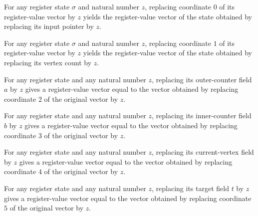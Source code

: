 \begin{lemma}
\label{Complexity.LogProg.UReg.u_0}
\leanok
{}
For any register state $\sigma$ and natural number $z$, replacing coordinate $0$ of its
register-value vector by $z$ yields the register-value vector of the state obtained by
replacing its input pointer by $z$.
\end{lemma}

\begin{lemma}
\label{Complexity.LogProg.UReg.u_1}
\leanok
{}
For any register state $\sigma$ and natural number $z$, replacing coordinate $1$ of its
register-value vector by $z$ yields the register-value vector of the state obtained by
replacing its vertex count by $z$.
\end{lemma}

\begin{lemma}
\label{Complexity.LogProg.UReg.u_2}
\leanok
{}
For any register state and any natural number $z$, replacing its outer-counter field $a$
by $z$ gives a register-value vector equal to the vector obtained by replacing
coordinate $2$ of the original vector by $z$.
\end{lemma}

\begin{lemma}
\label{Complexity.LogProg.UReg.u_3}
\leanok
{}
For any register state and any natural number $z$, replacing its inner-counter field $b$
by $z$ gives a register-value vector equal to the vector obtained by replacing
coordinate $3$ of the original vector by $z$.
\end{lemma}

\begin{lemma}
\label{Complexity.LogProg.UReg.u_4}
\leanok
{}
For any register state and any natural number $z$, replacing its current-vertex field by
$z$ gives a register-value vector equal to the vector obtained by replacing coordinate
$4$ of the original vector by $z$.
\end{lemma}

\begin{lemma}
\label{Complexity.LogProg.UReg.u_5}
\leanok
{}
For any register state and any natural number $z$, replacing its target field $t$ by $z$
gives a register-value vector equal to the vector obtained by replacing coordinate $5$
of the original vector by $z$.
\end{lemma}


